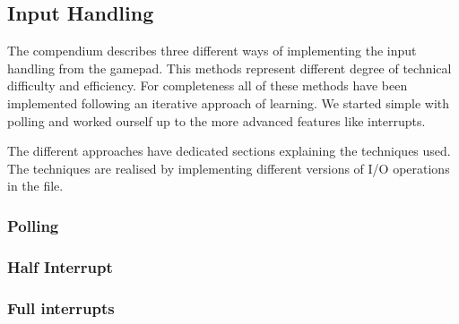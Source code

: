 \subsection{Input Handling}
The compendium describes three different ways of implementing the input handling from the gamepad. This methods represent different degree of technical difficulty and efficiency. For completeness all of these methods have been implemented following an iterative approach of learning. We started simple with polling and worked ourself up to the more advanced features like interrupts.  

The different approaches have dedicated sections explaining the techniques used. The techniques are realised by implementing different versions of I/O operations in the file.  

\subsubsection{Polling}


\subsubsection{Half Interrupt}


\subsubsection{Full interrupts}

